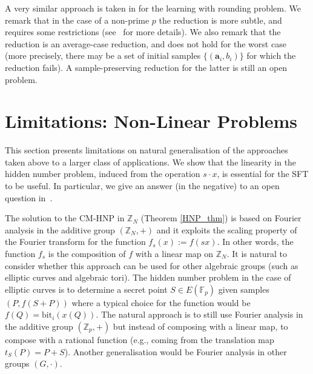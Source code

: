 \documentclass[11pt]{article}
\theoremstyle{definition}
\newcommand{\F}{{\mathbb{F}}}
\newcommand{\Z}{\mathbb{Z}}
\newcommand{\bit}{\text{bit}}
\begin{document}
A very similar approach is taken in \cite{LWR_reduction} for the learning with rounding problem. We remark that in the case of a non-prime $p$ the reduction is more subtle, and requires some restrictions (see~\cite{MM,LWR_reduction} for more details). We also remark that the reduction is an average-case reduction, and does not hold for the worst case (more precisely, there may be a set of initial samples $\{(\textbf{a}_i,b_i)\}$ for which the reduction fails). A sample-preserving reduction for the latter is still an open problem.



\section{Limitations: Non-Linear Problems}
\label{sec_limitations}

This section presents limitations on natural generalisation of the approaches taken above to a larger class of applications. We show that the linearity in the hidden number problem, induced from the operation $s \cdot x$, is essential for the SFT to be useful. In particular, we give an answer (in the negative) to an open question in~\cite{MIHNP}.

The solution to the CM-HNP in $\Z_N$ (Theorem \ref{HNP_thm}) is based on Fourier analysis in the additive group $(\Z_N,+)$ and it exploits the scaling property of the Fourier transform for the function $f_s(x) := f(sx)$. In other words, the function $f_s$ is the composition of $f$ with a linear map on $\Z_N$.
It is natural to consider whether this approach can be used for other algebraic groups (such as elliptic curves and algebraic tori).
The hidden number problem in the case of elliptic curves is to determine a secret point $S \in E( \F_p )$ given samples $( P, f( S + P ))$ where a typical choice for the function would be $f(Q) = \bit_i( x(Q))$.
The natural approach is to still use Fourier analysis in the additive group $(\Z_p,+)$ but instead of composing with a linear map, to compose with a rational function (e.g., coming from the translation map $t_S(P) = P+S$). Another generalisation would be Fourier
analysis in other groups $(G, \cdot)$.
\end{document}
